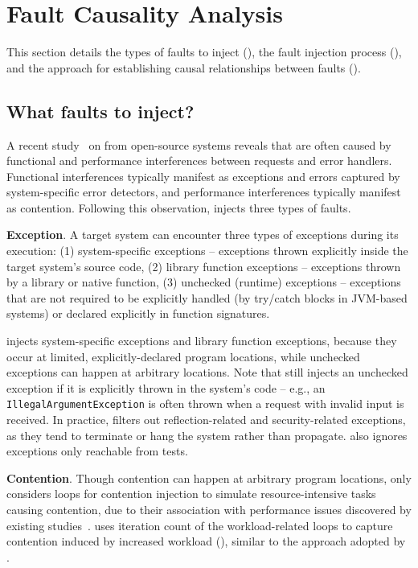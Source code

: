 \section{Fault Causality Analysis}
\label{sec:fia}



This section details 
the types of faults to inject (), 
the fault injection process (), 
and the approach for establishing causal relationships between faults (). 

\subsection{What faults to inject?} 
\label{sec:fia:faults-to-inject}

A recent study~\cite{qian2023vicious} 
on \vcs from open-source systems 
reveals that \vcs are often caused by 
functional and performance interferences 
between requests and error handlers. 
Functional interferences typically manifest 
as exceptions and errors captured by system-specific error detectors, 
and performance interferences typically manifest as contention. 
Following this observation, 
\tool injects three types of faults. 

\textbf{Exception}. 
A target system can encounter three types of exceptions 
during its execution: 
(1) system-specific exceptions 
-- exceptions thrown explicitly inside the target system's source code, 
(2) library function exceptions 
-- exceptions thrown by a library or native function, 
(3) unchecked (runtime) exceptions 
-- exceptions that are not required to be explicitly handled 
(by try/catch blocks in JVM-based systems) 
or declared explicitly in function signatures. 

\tool injects system-specific exceptions 
and library function exceptions, 
because they occur at limited, explicitly-declared program locations, 
while unchecked exceptions can happen at arbitrary locations. 
Note that \tool still injects an unchecked exception 
if it is explicitly thrown in the system's code 
-- e.g., an \texttt{IllegalArgumentException} is often thrown 
when a request with invalid input is received. 
In practice, 
\tool filters out reflection-related and
security-related exceptions, 
as they tend to terminate or hang the system 
rather than propagate. 
\tool also ignores exceptions 
only reachable from tests. 


\textbf{Contention}. 
Though contention can happen at arbitrary program locations, 
\tool only considers loops for contention injection 
to simulate resource-intensive tasks causing contention, 
due to their association with performance issues discovered by existing studies~\cite{li2018pcatch, jin2012understanding, qian2023vicious}.
\tool uses iteration count of the workload-related loops to capture contention induced by increased workload (), similar to the approach adopted by \citet{li2018pcatch}. 

